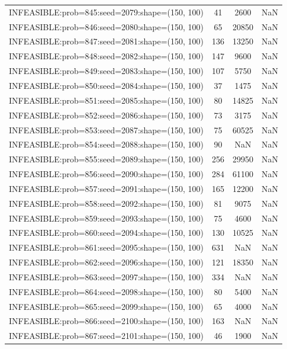\begin{longtable}{lccc}
INFEASIBLE:prob=845:seed=2079:shape=(150, 100) &    41 &  2600 &    NaN \\
INFEASIBLE:prob=846:seed=2080:shape=(150, 100) &    65 & 20850 &    NaN \\
INFEASIBLE:prob=847:seed=2081:shape=(150, 100) &   136 & 13250 &    NaN \\
INFEASIBLE:prob=848:seed=2082:shape=(150, 100) &   147 &  9600 &    NaN \\
INFEASIBLE:prob=849:seed=2083:shape=(150, 100) &   107 &  5750 &    NaN \\
INFEASIBLE:prob=850:seed=2084:shape=(150, 100) &    37 &  1475 &    NaN \\
INFEASIBLE:prob=851:seed=2085:shape=(150, 100) &    80 & 14825 &    NaN \\
INFEASIBLE:prob=852:seed=2086:shape=(150, 100) &    73 &  3175 &    NaN \\
INFEASIBLE:prob=853:seed=2087:shape=(150, 100) &    75 & 60525 &    NaN \\
INFEASIBLE:prob=854:seed=2088:shape=(150, 100) &    90 &   NaN &    NaN \\
INFEASIBLE:prob=855:seed=2089:shape=(150, 100) &   256 & 29950 &    NaN \\
INFEASIBLE:prob=856:seed=2090:shape=(150, 100) &   284 & 61100 &    NaN \\
INFEASIBLE:prob=857:seed=2091:shape=(150, 100) &   165 & 12200 &    NaN \\
INFEASIBLE:prob=858:seed=2092:shape=(150, 100) &    81 &  9075 &    NaN \\
INFEASIBLE:prob=859:seed=2093:shape=(150, 100) &    75 &  4600 &    NaN \\
INFEASIBLE:prob=860:seed=2094:shape=(150, 100) &   130 & 10525 &    NaN \\
INFEASIBLE:prob=861:seed=2095:shape=(150, 100) &   631 &   NaN &    NaN \\
INFEASIBLE:prob=862:seed=2096:shape=(150, 100) &   121 & 18350 &    NaN \\
INFEASIBLE:prob=863:seed=2097:shape=(150, 100) &   334 &   NaN &    NaN \\
INFEASIBLE:prob=864:seed=2098:shape=(150, 100) &    80 &  5400 &    NaN \\
INFEASIBLE:prob=865:seed=2099:shape=(150, 100) &    65 &  4000 &    NaN \\
INFEASIBLE:prob=866:seed=2100:shape=(150, 100) &   163 &   NaN &    NaN \\
INFEASIBLE:prob=867:seed=2101:shape=(150, 100) &    46 &  1900 &    NaN \\

\end{longtable}
